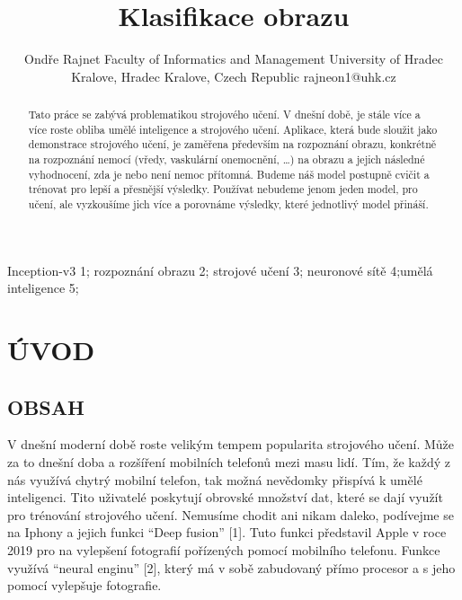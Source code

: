 \documentclass[journal]{IEEEtran}
\title{Klasifikace obrazu }
\author{Ondře Rajnet
        \linebreak
        Faculty of Informatics and Management
        \linebreak
        University of Hradec Kralove,
        \linebreak
        Hradec Kralove, Czech Republic
        \linebreak
        rajneon1@uhk.cz

}
\begin{document}
\maketitle

\begin{abstract}

Tato práce se zabývá problematikou strojového učení. V dnešní době, je stále více a více roste obliba umělé inteligence a strojového učení. Aplikace, která bude sloužit jako demonstrace strojového učení, je zaměřena především na rozpoznání obrazu, konkrétně na rozpoznání nemocí (vředy, vaskulární onemocnění, …) na obrazu a jejich následné vyhodnocení, zda je nebo není nemoc přítomná. Budeme náš model postupně cvičit a trénovat pro lepší a přesnější výsledky. Používat nebudeme jenom jeden model, pro učení, ale vyzkoušíme jich více a porovnáme výsledky, které jednotlivý model přináší.

\end{abstract}

\begin{IEEEkeywords}
Inception-v3 1; rozpoznání obrazu 2; strojové učení 3; neuronové sítě 4;umělá inteligence 5;
\end{IEEEkeywords}


\IEEEpeerreviewmaketitle



\section{ÚVOD}

\subsection{OBSAH}
V dnešní moderní době roste velikým tempem popularita strojového učení. Může za to dnešní doba a rozšíření mobilních telefonů mezi masu lidí. Tím, že každý z nás využívá chytrý mobilní telefon, tak možná nevědomky přispívá k umělé inteligenci. Tito uživatelé poskytují obrovské množství dat, které se dají využít pro trénování strojového učení.
Nemusíme chodit ani nikam daleko, podívejme se na Iphony a jejich funkci “Deep fusion” [1]. Tuto funkci představil Apple v roce 2019 pro na vylepšení fotografií pořízených pomocí mobilního telefonu. Funkce využívá “neural enginu” [2], který má v sobě zabudovaný přímo procesor a s jeho pomocí vylepšuje fotografie.
\end{document}
